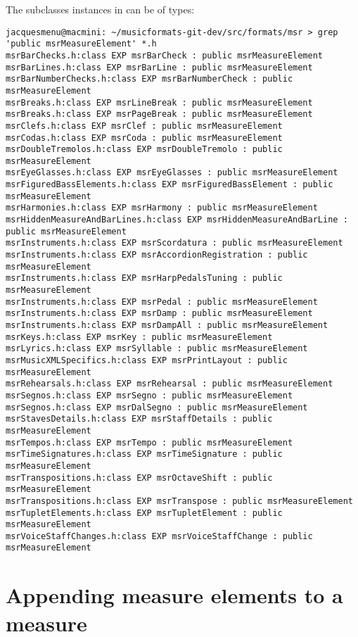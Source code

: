 The  subclasses instances in {\tt } can be of types:
\begin{lstlisting}[language=Terminal]
jacquesmenu@macmini: ~/musicformats-git-dev/src/formats/msr > grep 'public msrMeasureElement' *.h
msrBarChecks.h:class EXP msrBarCheck : public msrMeasureElement
msrBarLines.h:class EXP msrBarLine : public msrMeasureElement
msrBarNumberChecks.h:class EXP msrBarNumberCheck : public msrMeasureElement
msrBreaks.h:class EXP msrLineBreak : public msrMeasureElement
msrBreaks.h:class EXP msrPageBreak : public msrMeasureElement
msrClefs.h:class EXP msrClef : public msrMeasureElement
msrCodas.h:class EXP msrCoda : public msrMeasureElement
msrDoubleTremolos.h:class EXP msrDoubleTremolo : public msrMeasureElement
msrEyeGlasses.h:class EXP msrEyeGlasses : public msrMeasureElement
msrFiguredBassElements.h:class EXP msrFiguredBassElement : public msrMeasureElement
msrHarmonies.h:class EXP msrHarmony : public msrMeasureElement
msrHiddenMeasureAndBarLines.h:class EXP msrHiddenMeasureAndBarLine : public msrMeasureElement
msrInstruments.h:class EXP msrScordatura : public msrMeasureElement
msrInstruments.h:class EXP msrAccordionRegistration : public msrMeasureElement
msrInstruments.h:class EXP msrHarpPedalsTuning : public msrMeasureElement
msrInstruments.h:class EXP msrPedal : public msrMeasureElement
msrInstruments.h:class EXP msrDamp : public msrMeasureElement
msrInstruments.h:class EXP msrDampAll : public msrMeasureElement
msrKeys.h:class EXP msrKey : public msrMeasureElement
msrLyrics.h:class EXP msrSyllable : public msrMeasureElement
msrMusicXMLSpecifics.h:class EXP msrPrintLayout : public msrMeasureElement
msrRehearsals.h:class EXP msrRehearsal : public msrMeasureElement
msrSegnos.h:class EXP msrSegno : public msrMeasureElement
msrSegnos.h:class EXP msrDalSegno : public msrMeasureElement
msrStavesDetails.h:class EXP msrStaffDetails : public msrMeasureElement
msrTempos.h:class EXP msrTempo : public msrMeasureElement
msrTimeSignatures.h:class EXP msrTimeSignature : public msrMeasureElement
msrTranspositions.h:class EXP msrOctaveShift : public msrMeasureElement
msrTranspositions.h:class EXP msrTranspose : public msrMeasureElement
msrTupletElements.h:class EXP msrTupletElement : public msrMeasureElement
msrVoiceStaffChanges.h:class EXP msrVoiceStaffChange : public msrMeasureElement
\end{lstlisting}


\section{Appending measure elements to a measure}

